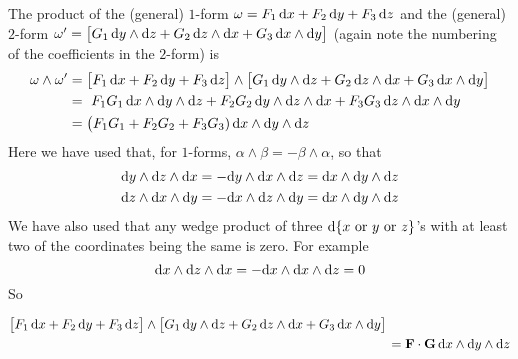 \begin{eg}\label{eg:diffFormAddMultB}
The product of the (general) $1$-form
    $\omega = F_1\,\mathrm{d}x
     + F_2\,\mathrm{d}y
     + F_3\,\mathrm{d}z
    $
and the (general) $2$-form
    $\omega'=\big[G_1\,\mathrm{d}y\wedge\mathrm{d}z
          + G_2\,\mathrm{d}z\wedge\mathrm{d}x
          + G_3\,\mathrm{d}x\wedge\mathrm{d}y\big]
    $
(again note the numbering of the coefficients in the $2$-form) is
\begin{align*}
  \omega\wedge\omega'
 &=\big[F_1\,\mathrm{d}x
     + F_2\,\mathrm{d}y
     + F_3\,\mathrm{d}z\big]
   \wedge
   \big[G_1\,\mathrm{d}y\wedge\mathrm{d}z
          + G_2\,\mathrm{d}z\wedge\mathrm{d}x
          + G_3\,\mathrm{d}x\wedge\mathrm{d}y\big] \\
  &= \ F_1G_1\,\mathrm{d}x\wedge\mathrm{d}y\wedge\mathrm{d}z
     + F_2G_2\,\mathrm{d}y\wedge\mathrm{d}z\wedge\mathrm{d}x
     + F_3G_3\,\mathrm{d}z\wedge\mathrm{d}x\wedge\mathrm{d}y \\
  & = \big(F_1G_1+F_2G_2+F_3G_3)\,\mathrm{d}x\wedge\mathrm{d}y\wedge\mathrm{d}z
\end{align*}
Here we have used that, for $1$-forms, $\alpha\wedge\beta=-\beta\wedge\alpha$,
so that 
\begin{align*}
\mathrm{d}y\wedge\mathrm{d}z\wedge\mathrm{d}x
&=-\mathrm{d}y\wedge\mathrm{d}x\wedge\mathrm{d}z=\mathrm{d}x\wedge\mathrm{d}y\wedge\mathrm{d}z
\\
\mathrm{d}z\wedge\mathrm{d}x\wedge\mathrm{d}y 
&=-\mathrm{d}x\wedge\mathrm{d}z\wedge\mathrm{d}y =\mathrm{d}x\wedge\mathrm{d}y\wedge\mathrm{d}z 
\end{align*}
We have also used that any wedge product of three 
$\mathrm{d}\{x\text{ or }y\text{ or }z\}$'s
with at least two of the coordinates being the same is zero. For example
\begin{equation*}
\mathrm{d}x\wedge\mathrm{d}z\wedge\mathrm{d}x = - \mathrm{d}x\wedge\mathrm{d}x\wedge\mathrm{d}z
   =0
\end{equation*}
So 
\begin{impeqn}\label{eqnProd1Form2Form}
\begin{align*}
   &\big[F_1\,\dee{x}
     + F_2\,\dee{y}
     + F_3\,\dee{z}\big]
   \wedge
   \big[G_1\,\dee{y}\wedge\dee{z}
          + G_2\,\dee{z}\wedge\dee{x}
          + G_3\,\dee{x}\wedge\dee{y}\big] \\
  &\hskip4in = \vF\cdot\vG\,\dee{x}\wedge\dee{y}\wedge\dee{z}
\end{align*}
\end{impeqn}
\end{eg}

